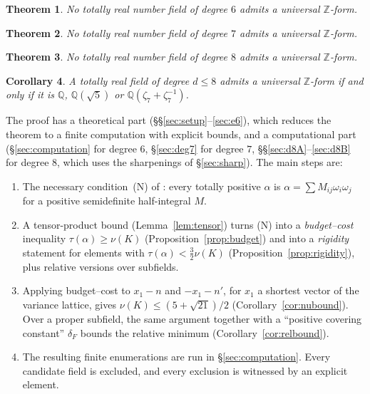 \documentclass[11pt]{amsart}
\newtheorem{theorem}{Theorem}[section]
\newtheorem{corollary}[theorem]{Corollary}
\theoremstyle{definition}
\newcommand{\Q}{\mathbb{Q}}
\newcommand{\Z}{\mathbb{Z}}
\begin{document}
\begin{theorem}\label{thm:main}
No totally real number field of degree $6$ admits a universal $\Z$-form.
\end{theorem}

\begin{theorem}\label{thm:seven}
No totally real number field of degree $7$ admits a universal $\Z$-form.
\end{theorem}

\begin{theorem}\label{thm:eight}
No totally real number field of degree $8$ admits a universal $\Z$-form.
\end{theorem}

\begin{corollary}\label{cor:le6}
A totally real field of degree $d\le 8$ admits a universal $\Z$-form if and only if it is
$\Q$, $\Q(\sqrt5)$ or $\Q(\zeta_7+\zeta_7^{-1})$.
\end{corollary}

The proof has a theoretical part (\S\S\ref{sec:setup}--\ref{sec:e6}), which reduces the
theorem to a finite computation with explicit bounds, and a computational part
(\S\ref{sec:computation} for degree $6$, \S\ref{sec:deg7} for degree $7$,
\S\S\ref{sec:d8A}--\ref{sec:d8B} for degree $8$, which uses the sharpenings of \S\ref{sec:sharp}).  The main
steps are:
\begin{enumerate}[label=(\roman*)]
\item The necessary condition~(N) of \cite{KY1}: every totally positive $\alpha$ is
  $\alpha=\sum M_{ij}\omega_i\omega_j$ for a positive semidefinite half-integral $M$.
\item A tensor-product bound (Lemma~\ref{lem:tensor}) turns (N) into a \emph{budget--cost}
  inequality $\tau(\alpha)\ge\nu(K)$ (Proposition~\ref{prop:budget}) and into a
  \emph{rigidity} statement for elements with $\tau(\alpha)<\frac32\nu(K)$
  (Proposition~\ref{prop:rigidity}), plus relative versions over subfields.
\item Applying budget--cost to $x_1-n$ and $-x_1-n'$, for $x_1$ a shortest vector of the variance
  lattice, gives $\nu(K)\le(5+\sqrt{21})/2$ (Corollary~\ref{cor:nubound}).  Over a proper
  subfield, the same argument together with a ``positive covering constant'' $\delta_F$ bounds
  the relative minimum (Corollary~\ref{cor:relbound}).
\item The resulting finite enumerations are run in \S\ref{sec:computation}.  Every candidate
  field is excluded, and every exclusion is witnessed by an explicit element.
\end{enumerate}
\end{document}

